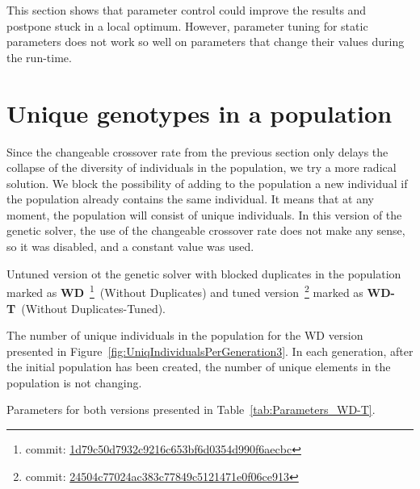 This section shows that parameter control could improve the results and postpone stuck in a local optimum. However, parameter tuning for static parameters does not work so well on parameters that change their values during the run-time.                     

\section{Unique genotypes in a population}
\label{sec:WD}

Since the changeable crossover rate from the previous section only delays the collapse of the diversity of individuals in the population, we try a more radical solution. We block the possibility of adding to the population a new individual if the population already contains the same individual. It means that at any moment, the population will consist of unique individuals. In this version of the genetic solver, the use of the changeable crossover rate does not make any sense, so it was disabled, and a constant value was used.

Untuned version ot the genetic solver with blocked duplicates in the population marked as  \textbf{WD}~\footnote{commit: \href{https://git-st.inf.tu-dresden.de/mquat/mquat2/commit/1d79c50d7932c9216c653bf6d0354d990f6aecbc}{1d79c50d7932c9216c653bf6d0354d990f6aecbc}}~(Without Duplicates) and tuned version~\footnote{commit: \href{https://git-st.inf.tu-dresden.de/mquat/mquat2/commit/24504c77024ac383c77849c5121471e0f06ce913}{24504c77024ac383c77849c5121471e0f06ce913}} marked as \textbf{WD-T}~(Without Duplicates-Tuned).

The number of unique individuals in the population for the WD version presented in Figure~\ref{fig:UniqIndividualsPerGeneration3}. In each generation, after the initial population has been created, the number of unique elements in the population is not changing.



Parameters for both versions presented in Table~\ref{tab:Parameters_WD-T}.


